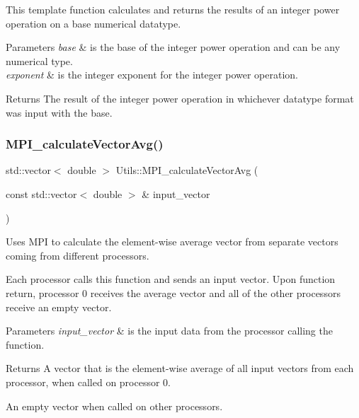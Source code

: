 This template function calculates and returns the results of an integer power operation on a base numerical datatype. 


\begin{DoxyParams}{Parameters}
{\em base} & is the base of the integer power operation and can be any numerical type. \\
\hline
{\em exponent} & is the integer exponent for the integer power operation. \\
\hline
\end{DoxyParams}
\begin{DoxyReturn}{Returns}
The result of the integer power operation in whichever datatype format was input with the base. 
\end{DoxyReturn}
\mbox{\label{namespace_utils_a71eeb04d74f890da3d27128c37fcff78}} 
\subsubsection{\texorpdfstring{M\+P\+I\+\_\+calculate\+Vector\+Avg()}{MPI\_calculateVectorAvg()}}
{\footnotesize\ttfamily std\+::vector$<$ double $>$ Utils\+::\+M\+P\+I\+\_\+calculate\+Vector\+Avg (\begin{DoxyParamCaption}\item[{const std\+::vector$<$ double $>$ \&}]{input\+\_\+vector }\end{DoxyParamCaption})}



Uses M\+PI to calculate the element-\/wise average vector from separate vectors coming from different processors. 

Each processor calls this function and sends an input vector. Upon function return, processor 0 receives the average vector and all of the other processors receive an empty vector. 
\begin{DoxyParams}{Parameters}
{\em input\+\_\+vector} & is the input data from the processor calling the function. \\
\hline
\end{DoxyParams}
\begin{DoxyReturn}{Returns}
A vector that is the element-\/wise average of all input vectors from each processor, when called on processor 0. 

An empty vector when called on other processors. 
\end{DoxyReturn}
\mbox{\label{namespace_utils_a0a17d0ad939418dc745bcfd194ce2bc1}} 
